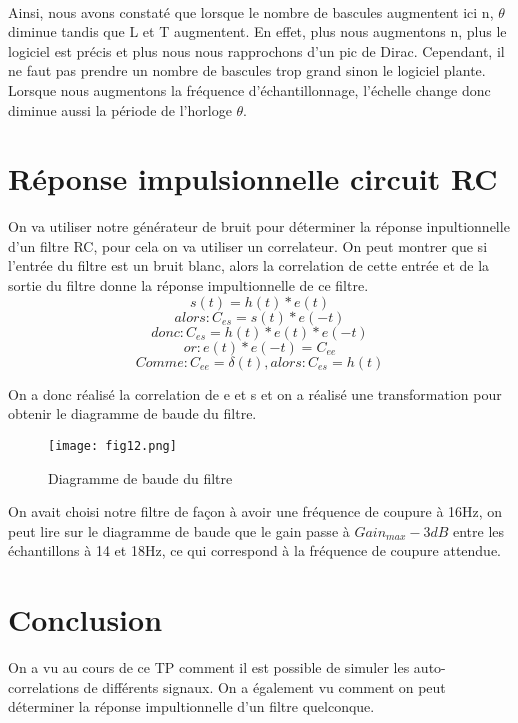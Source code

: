\documentclass[oneside,a4paper,12pt]{article}
\begin{document}
	
	\paragraph{}
	Ainsi, nous avons constaté que lorsque le nombre de bascules augmentent ici n, $\theta$ diminue tandis que L et T augmentent. En effet, plus nous augmentons n, plus le logiciel est précis et plus nous nous rapprochons d’un pic de Dirac. Cependant, il ne faut pas prendre un nombre de bascules trop grand sinon le logiciel plante. Lorsque nous augmentons la fréquence d'échantillonnage, l'échelle change donc diminue aussi la période de l’horloge $\theta$.
	
	\section{Réponse impulsionnelle circuit RC}
	
	On va utiliser notre générateur de bruit pour déterminer la réponse inpultionnelle d'un filtre RC, pour cela on va utiliser un correlateur. On peut montrer que si l'entrée du filtre est un bruit blanc, alors la correlation de cette entrée et de la sortie du filtre donne la réponse impultionnelle de ce filtre.\\
	$$ s(t) = h(t)*e(t) $$
	$$ alors: C_{es} = s(t)*e(-t)$$
	$$ donc: C_{es} = h(t)*e(t)*e(-t) $$
	$$ or: e(t)*e(-t) = C_{ee} $$
	$$ Comme: C_{ee}=\delta(t), alors: C_{es} = h(t) $$
	
	On a donc réalisé la correlation de e et s et on a réalisé une transformation pour obtenir le diagramme de baude du filtre.
	
	\begin{figure}[h]
		\centering
		\texttt{[image: fig12.png]}
		\caption{Diagramme de baude du filtre}
	\end{figure}

	On avait choisi notre filtre de façon à avoir une fréquence de coupure à 16Hz, on peut lire sur le diagramme de baude que le gain passe à $Gain_{max}-3dB$ entre les échantillons à 14 et 18Hz, ce qui correspond à la fréquence de coupure attendue.
	
	\section{Conclusion}

	On a vu au cours de ce TP comment il est possible de simuler les auto-correlations de différents signaux. On a également vu comment on peut déterminer la réponse impultionnelle d'un filtre quelconque.\\
\end{document}
